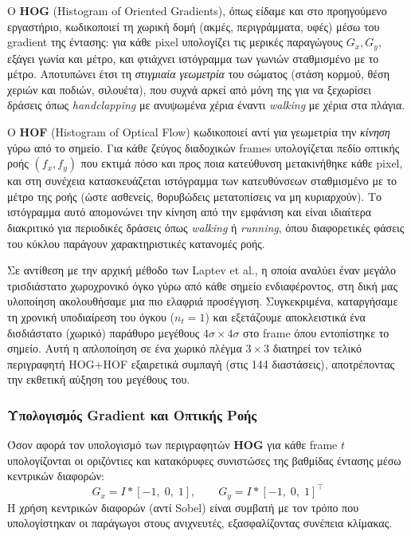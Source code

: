 \documentclass[12pt, a4paper]{article}
\begin{document}
Ο \textbf{HOG} (Histogram of Oriented Gradients), όπως είδαμε και στο
προηγούμενο εργαστήριο, κωδικοποιεί τη χωρική δομή (ακμές, περιγράμματα,
υφές) μέσω του gradient της έντασης: για κάθε pixel υπολογίζει τις
μερικές παραγώγους $G_x, G_y$, εξάγει γωνία και μέτρο, και φτιάχνει
ιστόγραμμα των γωνιών σταθμισμένο με το μέτρο. Αποτυπώνει έτσι τη
\emph{στιγμιαία γεωμετρία} του σώματος (στάση κορμού, θέση χεριών και
ποδιών, σιλουέτα), που συχνά αρκεί από μόνη της για να ξεχωρίσει
δράσεις όπως \textit{handclapping} με ανυψωμένα χέρια έναντι
\textit{walking} με χέρια στα πλάγια.

Ο \textbf{HOF} (Histogram of Optical Flow) κωδικοποιεί αντί για γεωμετρία
την \emph{κίνηση} γύρω από το σημείο. Για κάθε ζεύγος διαδοχικών frames
υπολογίζεται πεδίο οπτικής ροής $(f_x, f_y)$ που εκτιμά πόσο και προς
ποια κατεύθυνση μετακινήθηκε κάθε pixel, και στη συνέχεια κατασκευάζεται
ιστόγραμμα των κατευθύνσεων σταθμισμένο με το μέτρο της ροής (ώστε
ασθενείς, θορυβώδεις μετατοπίσεις να μη κυριαρχούν). Το ιστόγραμμα αυτό
απομονώνει την κίνηση από την εμφάνιση και είναι ιδιαίτερα διακριτικό
για περιοδικές δράσεις όπως \textit{walking} ή \textit{running}, όπου
διαφορετικές φάσεις του κύκλου παράγουν χαρακτηριστικές κατανομές ροής.

Σε αντίθεση με την αρχική μέθοδο των Laptev et al., η οποία αναλύει έναν μεγάλο τρισδιάστατο χωροχρονικό όγκο γύρω από κάθε σημείο ενδιαφέροντος, στη δική μας υλοποίηση ακολουθήσαμε μια πιο ελαφριά προσέγγιση. Συγκεκριμένα, καταργήσαμε τη χρονική υποδιαίρεση του όγκου ($n_t=1$) και εξετάζουμε αποκλειστικά ένα δισδιάστατο (χωρικό) παράθυρο μεγέθους $4\sigma \times 4\sigma$ στο frame όπου εντοπίστηκε το σημείο. Αυτή η απλοποίηση σε ένα χωρικό πλέγμα $3\times3$ διατηρεί τον τελικό περιγραφητή HOG+HOF εξαιρετικά συμπαγή (στις 144 διαστάσεις), αποτρέποντας την εκθετική αύξηση του μεγέθους του.

\subsubsection{Υπολογισμός Gradient και Οπτικής Ροής}

Όσον αφορά τον υπολογισμό των περιγραφητών \textbf{HOG} για κάθε frame $t$ υπολογίζονται οι οριζόντιες και κατακόρυφες συνιστώσες της
βαθμίδας έντασης μέσω κεντρικών διαφορών:
\begin{equation}
    G_x = I \ast [-1,\;0,\;1], \qquad G_y = I \ast [-1,\;0,\;1]^\top
\end{equation}
Η χρήση κεντρικών διαφορών (αντί Sobel) είναι συμβατή με τον τρόπο που
υπολογίστηκαν οι παράγωγοι στους ανιχνευτές, εξασφαλίζοντας συνέπεια κλίμακας.
\end{document}
